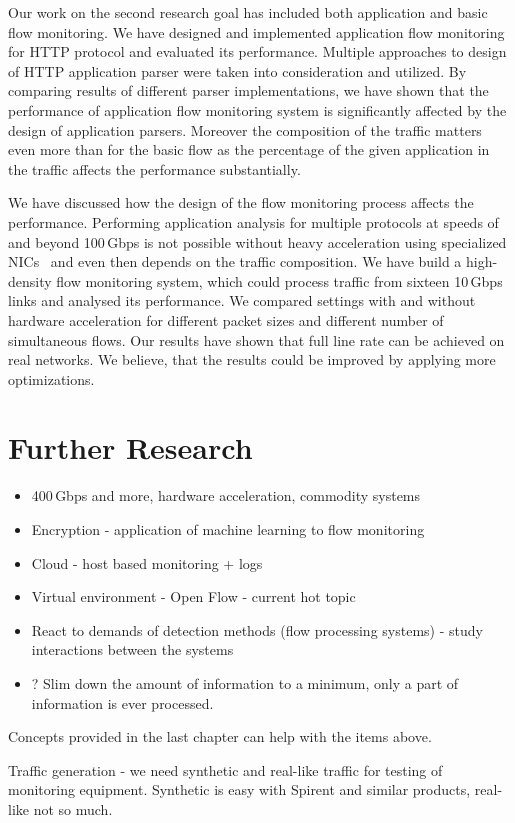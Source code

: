 Our work on the second research goal has included both application and basic flow monitoring. We have designed and implemented application flow monitoring for HTTP protocol and evaluated its performance. Multiple approaches to design of HTTP application parser were taken into consideration and utilized. By comparing results of different parser implementations, we have shown that the performance of application flow monitoring system is significantly affected by the design of application parsers. Moreover the composition of the traffic matters even more than for the basic flow as the percentage of the given application in the traffic affects the performance substantially.

We have discussed how the design of the flow monitoring process affects the performance. Performing application analysis for multiple protocols at speeds of and beyond 100\,Gbps is not possible without heavy acceleration using specialized NICs~\cite{Kekely-2016-Software} and even then depends on the traffic composition. We have build a high-density flow monitoring system, which could process traffic from sixteen 10\,Gbps links and analysed its performance. We compared settings with and without hardware acceleration for different packet sizes and different number of simultaneous flows. Our results have shown that full line rate can be achieved on real networks. We believe, that the results could be improved by applying more optimizations.



\section{Further Research}

\begin{itemize}
  \item 400\,Gbps and more, hardware acceleration, commodity systems
  \item Encryption - application of machine learning to flow monitoring
  \item Cloud - host based monitoring + logs
  \item Virtual environment - Open Flow - current hot topic
  \item React to demands of detection methods (flow processing systems) - study interactions between the systems
  \item ? Slim down the amount of information to a minimum, only a part of information is ever processed.
\end{itemize}

Concepts provided in the last chapter can help with the items above.

Traffic generation - we need synthetic and real-like traffic for testing of monitoring equipment. Synthetic is easy with Spirent and similar products, real-like not so much.

